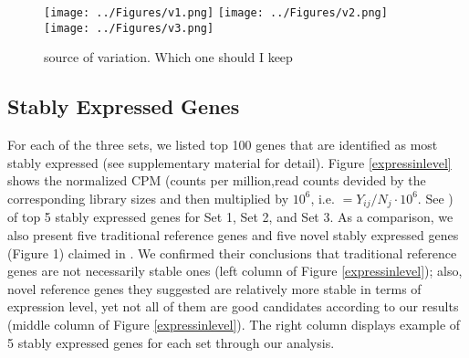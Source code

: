 \documentclass[11pt, a4paper]{article}
\begin{document}
 \begin{figure}[h]
\begin{center}
\caption{\label{scatterplot} source of variation. Which one should I keep}
\texttt{[image: ../Figures/v1.png]}
\texttt{[image: ../Figures/v2.png]}
\texttt{[image: ../Figures/v3.png]}
\end{center}
\end{figure} 

  \subsection{Stably Expressed Genes}
For each of the three sets, we listed top 100 genes that are identified as most stably expressed (see supplementary material for detail). Figure \ref{expressinlevel} shows the normalized CPM (counts per million,read counts devided by the corresponding library sizes and then multiplied by $10^6$, i.e. $=Y_{ij}/N_j\cdot 10^6$.  See \cite{anders2013count}) of top 5 stably expressed genes for Set 1, Set 2, and Set 3. As a comparison, we also present five traditional reference genes and five novel stably expressed genes (Figure 1) claimed in  \cite{czechowski2005genome} . We confirmed their conclusions that traditional reference genes are not necessarily stable ones (left column of Figure \ref{expressinlevel}); also, novel reference genes they suggested are relatively more stable in terms of expression level, yet not all of them are good candidates according to our results (middle column of Figure \ref{expressinlevel}). The right column displays example of 5 stably expressed genes for each set through our analysis.
\end{document}
